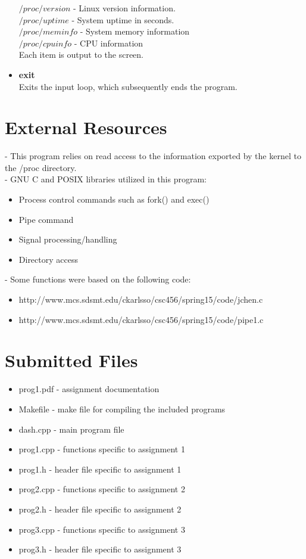 \documentclass{article}
\begin{document}
\begin{itemize}
$/proc/version$ - Linux version information. \\
$/proc/uptime$  - System uptime in seconds.\\
$/proc/meminfo$ - System memory information\\
$/proc/cpuinfo$ - CPU information\\
Each item is output to the screen.

\item \textbf{exit}\\
Exits the input loop, which subsequently ends the program.
\end{itemize}


\section{External Resources}
- This program relies on read access to the information exported by the kernel to the /proc directory.\\

- GNU C and POSIX libraries utilized in this program:
\begin{itemize}
\item Process control commands such as fork() and exec()
\item Pipe command
\item Signal processing/handling
\item Directory access
\end{itemize}
	
- Some functions were based on the following code:
\begin{itemize}
\item http://www.mcs.sdsmt.edu/ckarlsso/csc456/spring15/code/jchen.c
\item http://www.mcs.sdsmt.edu/ckarlsso/csc456/spring15/code/pipe1.c
\end{itemize}


\section{Submitted Files}
\begin{itemize}
\item prog1.pdf - assignment documentation
\item Makefile  - make file for compiling the included programs
\item dash.cpp  - main program file
\item prog1.cpp - functions specific to assignment 1
\item prog1.h   - header file specific to assignment 1
\item prog2.cpp - functions specific to assignment 2
\item prog2.h   - header file specific to assignment 2
\item prog3.cpp - functions specific to assignment 3
\item prog3.h   - header file specific to assignment 3
\end{itemize}
\end{document}
